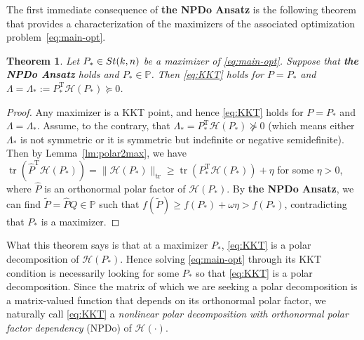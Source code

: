\documentclass[11pt]{article}
\def\bbP{\mathbb{P}}
\def\scrH{\mathscr{H}}
\def\wtd{\widetilde}
\def\what{\widehat}
\newcommand\STM[2]{{\rm St}(#1,#2)}
\DeclareMathOperator{\diag}{diag}
\DeclareMathOperator{\tr}{tr}
\DeclareMathOperator{\T}{T}
\newtheorem{theorem}{Theorem}[section]
\theoremstyle{definition}
\numberwithin{equation}{section}
\begin{document}

The first immediate consequence of {\bf the NPDo Ansatz} is the following theorem that provides a characterization of
the maximizers of the associated optimization problem~\eqref{eq:main-opt}.

\begin{theorem}\label{thm:maxers-NPD}
Let $P_*\in\STM{k}{n}$ be a maximizer of \eqref{eq:main-opt}.
Suppose that {\bf the NPDo Ansatz} holds and $P_*\in\bbP$. Then
\eqref{eq:KKT} holds for $P=P_*$ and $\Lambda=\Lambda_*:=P_*^{\T}\scrH(P_*)\succeq 0$.
\end{theorem}


\begin{proof}
Any maximizer is a KKT point, and hence \eqref{eq:KKT} holds for $P=P_*$ and $\Lambda=\Lambda_*$.
Assume, to the contrary, that
$\Lambda_*=P_*^{\T}\scrH(P_*)\not\succeq 0$
(which means either $\Lambda_*$ is not symmetric or it is symmetric but indefinite or negative semidefinite).
Then by Lemma~\ref{lm:polar2max}, we have
$\tr(\what P^{\T}\scrH(P_*))=\|\scrH(P_*)\|_{\tr}\ge \tr(P_*^{\T}\scrH(P_*))+\eta$ for some $\eta>0$, where $\what P$ is an orthonormal polar factor of $\scrH(P_*)$.
By {\bf the NPDo Ansatz}, we can find $\wtd P=\what PQ\in\bbP$ such that
$f(\wtd P)\ge f(P_*)+\omega\eta> f(P_*)$, contradicting that $P_*$ is a maximizer.
\end{proof}

What this theorem says is that at a maximizer $P_*$, \eqref{eq:KKT} is a polar decomposition of $\scrH(P_*)$. Hence
solving \eqref{eq:main-opt} through its KKT condition is necessarily looking for
some $P_*$ so that \eqref{eq:KKT} is a polar decomposition. Since the matrix of which we are seeking
a  polar decomposition is a matrix-valued function that depends on its orthonormal polar factor, we
naturally call \eqref{eq:KKT} a {\em nonlinear polar decomposition with orthonormal polar factor dependency\/} (NPDo) of $\scrH(\cdot)$.
\end{document}
